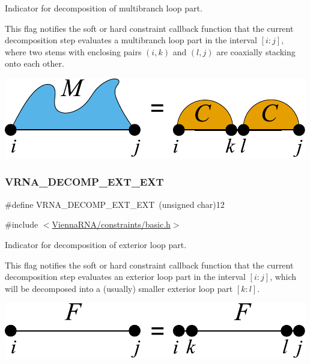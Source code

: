 Indicator for decomposition of multibranch loop part. 

This flag notifies the soft or hard constraint callback function that the current decomposition step evaluates a multibranch loop part in the interval $[i:j]$, where two stems with enclosing pairs $(i,k)$ and $(l,j)$ are coaxially stacking onto each other.

 
\begin{DoxyImageNoCaption}
  \mbox{\includegraphics[width=\textwidth,height=\textheight/2,keepaspectratio=true]{decomp_ml_coaxial}}
\end{DoxyImageNoCaption}
 \mbox{\label{group__constraints_ga437adf5115c1999304eff26b41e4c9b6}} 
\subsubsection{\texorpdfstring{VRNA\_DECOMP\_EXT\_EXT}{VRNA\_DECOMP\_EXT\_EXT}}
{\footnotesize\ttfamily \#define V\+R\+N\+A\+\_\+\+D\+E\+C\+O\+M\+P\+\_\+\+E\+X\+T\+\_\+\+E\+XT~(unsigned char)12}



{\ttfamily \#include $<$\mbox{\hyperlink{constraints_2basic_8h}{Vienna\+R\+N\+A/constraints/basic.\+h}}$>$}



Indicator for decomposition of exterior loop part. 

This flag notifies the soft or hard constraint callback function that the current decomposition step evaluates an exterior loop part in the interval $[i:j]$, which will be decomposed into a (usually) smaller exterior loop part $[k:l]$.

 
\begin{DoxyImageNoCaption}
  \mbox{\includegraphics[width=\textwidth,height=\textheight/2,keepaspectratio=true]{decomp_ext_ext}}
\end{DoxyImageNoCaption}
 \mbox{\label{group__constraints_gaff1ddaffe86d984623910b40cc8a8717}} 

